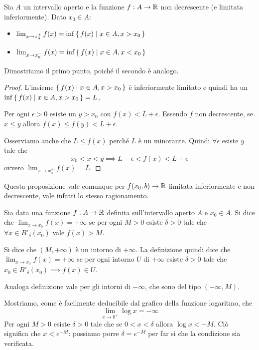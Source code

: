 \begin{proposition}
Sia $A$ un intervallo aperto e la funzione $f : A \to \mathbb R$ non decrescente (e limitata inferiormente). Dato $x_0 \in A$:
\begin{itemize}
\item $\lim_{x \to x_0^+} f(x) = \inf \set{f(x) | x \in A, x > x_0}$
\item $\lim_{x \to x_0^-} f(x) = \inf \set{f(x) | x \in A, x < x_0}$
\end{itemize}
\end{proposition}

Dimostriamo il primo punto, poiché il secondo è analogo.
\begin{proof}
L'insieme $\set{f(x) | x \in A, x > x_0}$ è inferiormente limitato e quindi ha un $\inf \set{f(x) | x \in A, x > x_0} = L$.

Per ogni $\epsilon > 0$ esiste un $y > x_0$ con $f(x) < L + \epsilon$. Essendo $f$ non decrescente, se $x \le y$ allora $f(x) \le f(y) < L + \epsilon$.

Osserviamo anche che $L \le f(x)$ perché $L$ è un minorante. Quindi $\forall \epsilon$ esiste $y$ tale che
\begin{equation*}
x_0 < x < y \implies L - \epsilon < f(x) < L + \epsilon
\end{equation*}
ovvero $\lim_{x \to x_0^+} f(x) = L$.
\end{proof}

Questa proposizione vale comunque per $f(x_0, b) \to \mathbb R$ limitata inferiormente e non decrescente, vale infatti lo stesso ragionamento.

\begin{definition}
Sia data una funzione $f: A \to \mathbb R$ definita sull'intervallo aperto $A$ e $x_0 \in A$. Si dice che $\lim_{x \to x_0} f(x) = +\infty$ se per ogni $M > 0$ esiste $\delta > 0$ tale che $\forall x \in B'_\delta (x_0)$ vale $f(x) > M$.
\end{definition}

Si dice che $(M, +\infty)$ è un intorno di $+\infty$. La definizione quindi dice che $\lim_{x \to x_0} f(x) = +\infty$ se per ogni intorno $U$ di $+\infty$ esiste $\delta > 0$ tale che $x_0 \in B'_\delta (x_0) \implies f(x) \in U$.

Analoga definizione vale per gli intorni di $-\infty$, che sono del tipo $(-\infty, M)$.

\begin{example}
Mostriamo, come è facilmente deducibile dal grafico della funzione logaritmo, che
\begin{equation*}
\lim_{x \to 0^+} \log x = -\infty
\end{equation*}
Per ogni $M > 0$ esiste $\delta > 0$ tale che se $0 < x < \delta$ allora $\log x < -M$. Ciò significa che $x < e^{-M}$: possiamo porre $\delta = e^{-M}$ per far sì che la condizione sia verificata.
\end{example}

